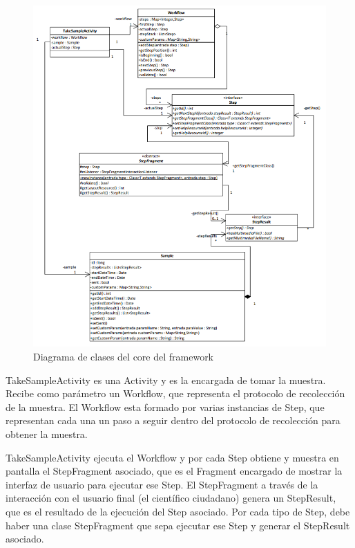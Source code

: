 \begin{figure}[H]
  \centering
    \includegraphics[scale=0.8]{05-implementacion/FrameworkCore.png} 
   \caption{Diagrama de clases del core del framework}
   \label{fig:umlFrameworkCore}
\end{figure}


TakeSampleActivity es una Activity y es la encargada de tomar la muestra.
Recibe como parámetro un Workflow, que representa el protocolo de recolección de la muestra.
El Workflow esta formado por varias instancias de Step, que representan cada una un paso a seguir dentro del protocolo de recolección para obtener la muestra.

TakeSampleActivity ejecuta el Workflow y por cada Step obtiene y muestra en pantalla el StepFragment asociado, que es el Fragment encargado de mostrar la interfaz de usuario para ejecutar ese Step. 
El StepFragment a través de la interacción con el usuario final (el científico ciudadano) genera un StepResult, que es el resultado de la ejecución del Step asociado. Por cada tipo de Step, debe haber una clase StepFragment que sepa ejecutar ese Step y generar el StepResult asociado.

